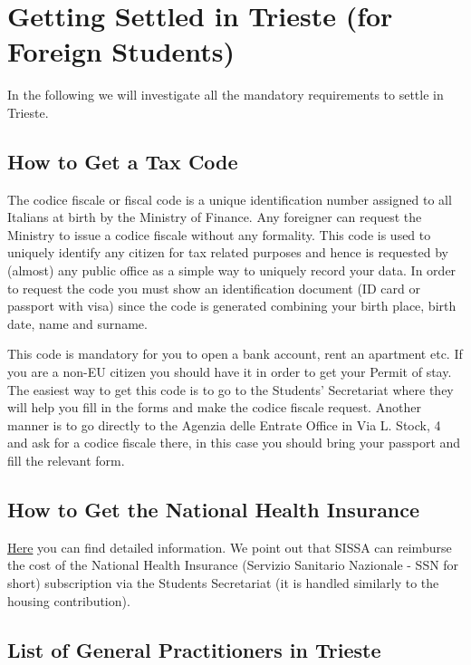 \documentclass{sissavademecum}
\begin{document}
\chapter{Getting Settled in Trieste (for Foreign Students)}

In the following we will investigate all the mandatory requirements to settle in Trieste. 


\section{How to Get a Tax Code}

The codice fiscale or fiscal code is a unique identification number assigned to all Italians at birth by the Ministry of Finance. Any foreigner can request the Ministry to issue a codice fiscale without any formality. This code is used to uniquely identify any citizen for tax related purposes and hence is requested by (almost) any public office as a simple way to uniquely record your data. In order to request the code you must show an identification document (ID card or passport with visa) since the code is generated combining your birth place, birth date, name and surname.

This code is mandatory for you to open a bank account, rent an apartment etc. If you are a non-EU citizen you should have it in order to get your Permit of stay. The easiest way to get this code is to go to the Students' Secretariat where they will help you fill in the forms and make the codice fiscale request. Another manner is to go directly to the Agenzia delle Entrate Office in Via L. Stock, 4 and ask for a codice fiscale there, in this case you should bring your passport and fill the relevant form. 


\section{How to Get the National Health Insurance}

\href{http://wiki.sissa.it/students/index.php/Health_Insurance}{Here} you can find detailed information. We point out that SISSA can reimburse the cost of the National Health Insurance (Servizio Sanitario Nazionale - SSN for short) subscription via the Students Secretariat (it is handled similarly to the housing contribution).


\section{List of General Practitioners in Trieste}
\end{document}
